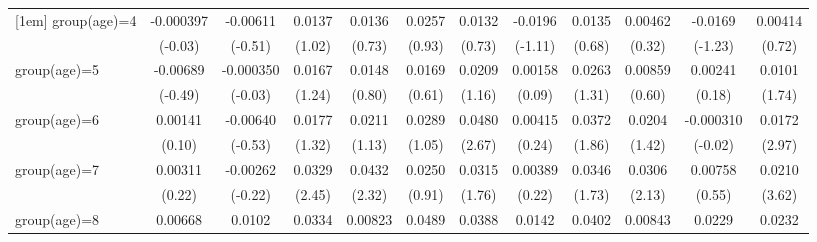 \begin{table}[htbp]
\begin{tabular}{l*{11}{c}}
[1em]
group(age)=4        &   -0.000397         &    -0.00611         &      0.0137         &      0.0136         &      0.0257         &      0.0132         &     -0.0196         &      0.0135         &     0.00462         &     -0.0169         &     0.00414         \\
                    &     (-0.03)         &     (-0.51)         &      (1.02)         &      (0.73)         &      (0.93)         &      (0.73)         &     (-1.11)         &      (0.68)         &      (0.32)         &     (-1.23)         &      (0.72)         \\
[1em]
group(age)=5        &    -0.00689         &   -0.000350         &      0.0167         &      0.0148         &      0.0169         &      0.0209         &     0.00158         &      0.0263         &     0.00859         &     0.00241         &      0.0101         \\
                    &     (-0.49)         &     (-0.03)         &      (1.24)         &      (0.80)         &      (0.61)         &      (1.16)         &      (0.09)         &      (1.31)         &      (0.60)         &      (0.18)         &      (1.74)         \\
[1em]
group(age)=6        &     0.00141         &    -0.00640         &      0.0177         &      0.0211         &      0.0289         &      0.0480\sym{*}  &     0.00415         &      0.0372         &      0.0204         &   -0.000310         &      0.0172\sym{**} \\
                    &      (0.10)         &     (-0.53)         &      (1.32)         &      (1.13)         &      (1.05)         &      (2.67)         &      (0.24)         &      (1.86)         &      (1.42)         &     (-0.02)         &      (2.97)         \\
[1em]
group(age)=7        &     0.00311         &    -0.00262         &      0.0329\sym{*}  &      0.0432\sym{*}  &      0.0250         &      0.0315         &     0.00389         &      0.0346         &      0.0306\sym{*}  &     0.00758         &      0.0210\sym{***}\\
                    &      (0.22)         &     (-0.22)         &      (2.45)         &      (2.32)         &      (0.91)         &      (1.76)         &      (0.22)         &      (1.73)         &      (2.13)         &      (0.55)         &      (3.62)         \\
[1em]
group(age)=8        &     0.00668         &      0.0102         &      0.0334\sym{*}  &     0.00823         &      0.0489         &      0.0388\sym{*}  &      0.0142         &      0.0402\sym{*}  &     0.00843         &      0.0229         &      0.0232\sym{***}\\

\end{tabular}
\end{table}

